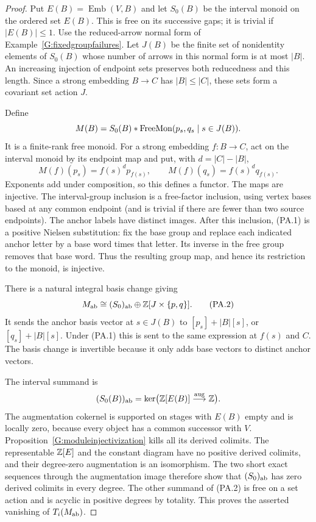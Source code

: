 \begin{proof}
Put $E(B)=\operatorname{Emb}(V,B)$ and let $S_0(B)$ be the
interval monoid on the ordered set $E(B)$. This is free on its
successive gaps; it is trivial if $|E(B)|\le1$.
Use the reduced-arrow normal form of
Example~\ref{G:fixedgroupfailures}. Let $J(B)$ be the finite
set of nonidentity elements of $S_0(B)$ whose number of arrows
in this normal form is at most $|B|$. An increasing injection
of endpoint sets preserves both reducedness and this length.
Since a strong embedding $B\to C$ has $|B|\le|C|$, these
sets form a covariant set action $J$.

Define
\[
 M(B)=S_0(B)*\mathrm{FreeMon}(p_s,q_s\mid s\in J(B)).
\]
It is a finite-rank free monoid. For a strong embedding
$f:B\to C$, act on the interval monoid by its endpoint map and
put, with $d=|C|-|B|$,
\[
 M(f)(p_s)=f(s)^d p_{f(s)},\qquad
 M(f)(q_s)=f(s)^d q_{f(s)}.
 \tag{PA.1}
\]
Exponents add under composition, so this defines a functor.
The maps are injective. The interval-group inclusion is a
free-factor inclusion, using vertex bases based at any common
endpoint (and is trivial if there are fewer than two source
endpoints). The anchor labels have distinct images. After this
inclusion, (PA.1) is a positive Nielsen substitution: fix the
base group and replace each indicated anchor letter by a base
word times that letter. Its inverse in the free group removes
that base word. Thus the resulting group map, and hence its
restriction to the monoid, is injective.

There is a natural integral basis change giving
\[
 M_{\mathrm{ab}}\cong (S_0)_{\mathrm{ab}}\oplus\mathbb Z[J\times\{p,q\}].
 \tag{PA.2}
\]
It sends the anchor basis vector at $s\in J(B)$ to
$[p_s]+|B|[s]$, or $[q_s]+|B|[s]$. Under (PA.1) this is
sent to the same expression at $f(s)$ and $C$.
The basis change is invertible because it only adds base
vectors to distinct anchor vectors.

The interval summand is
\[
 (S_0(B))_{\mathrm{ab}}
 =\ker\bigl(\mathbb Z[E(B)]\stackrel{\operatorname{aug}}{\longrightarrow}\mathbb Z\bigr).
\]
The augmentation cokernel is supported on stages with $E(B)$
empty and is locally zero, because every object has a common
successor with $V$. Proposition~\ref{G:moduleinjectivization}
kills all its derived colimits. The representable
$\mathbb Z[E]$ and the constant diagram have no positive derived
colimits, and their degree-zero augmentation is an isomorphism.
The two short exact sequences through the augmentation image
therefore show that $(S_0)_{\mathrm{ab}}$ has zero derived colimits
in every degree. The other summand of (PA.2) is free on a
set action and is acyclic in positive degrees by totality.
This proves the asserted vanishing of $T_i(M_{\mathrm{ab}})$.


\end{proof}
